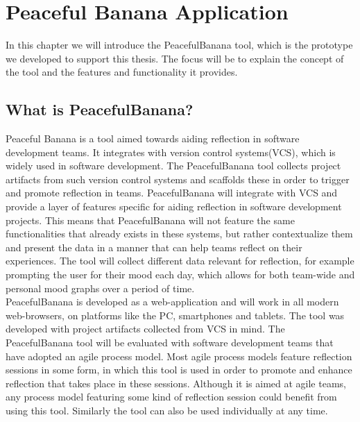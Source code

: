 \chapter{Peaceful Banana Application}
\label{peacefulBananaApplication}
In this chapter we will introduce the PeacefulBanana tool, which is the prototype we developed to support this thesis. The focus will be to explain the concept of the tool and the features and functionality it provides. 

\section{What is PeacefulBanana?}
Peaceful Banana is a tool aimed towards aiding reflection in software development teams. It integrates with version control systems(VCS), which is widely used in software development. The PeacefulBanana tool collects project artifacts from such version control systems and scaffolds these in order to trigger and promote reflection in teams. PeacefulBanana will integrate with VCS and provide a layer of features specific for aiding reflection in software development projects. This means that PeacefulBanana will not feature the same functionalities that already exists in these systems, but rather contextualize them and present the data in a manner that can help teams reflect on their experiences. The tool will collect different data relevant for reflection, for example prompting the user for their mood each day, which allows for both team-wide and personal mood graphs over a period of time. \\
PeacefulBanana is developed as a web-application and will work in all modern web-browsers, on platforms like the PC, smartphones and tablets.
The tool was developed with project artifacts collected from VCS in mind. The PeacefulBanana tool will be evaluated with software development teams that have adopted an agile process model. Most agile process models feature reflection sessions in some form, in which this tool is used in order to promote and enhance reflection that takes place in these sessions. Although it is aimed at agile teams, any process model featuring some kind of reflection session could benefit from using this tool. Similarly the tool can also be used individually at any time. 

